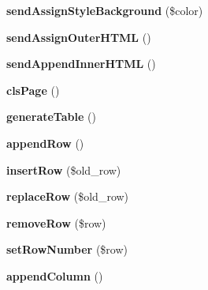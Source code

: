 \begin{DoxyCompactItemize}
\item 
\hypertarget{classclsPage_a0315870b55719467ad885007a5693394}{
{\bfseries sendAssignStyleBackground} (\$color)}
\label{classclsPage_a0315870b55719467ad885007a5693394}

\item 
\hypertarget{classclsPage_af2a2482d6a1a3b2f6627ff81d4dc2cd1}{
{\bfseries sendAssignOuterHTML} ()}
\label{classclsPage_af2a2482d6a1a3b2f6627ff81d4dc2cd1}

\item 
\hypertarget{classclsPage_af3d458057796887f6970506d45cd8187}{
{\bfseries sendAppendInnerHTML} ()}
\label{classclsPage_af3d458057796887f6970506d45cd8187}

\item 
\hypertarget{classclsPage_a7570ae140bcbd468397dce3f68a106dc}{
{\bfseries clsPage} ()}
\label{classclsPage_a7570ae140bcbd468397dce3f68a106dc}

\item 
\hypertarget{classclsPage_a54096a4d02a62858f8ce2bfa2a4675ea}{
{\bfseries generateTable} ()}
\label{classclsPage_a54096a4d02a62858f8ce2bfa2a4675ea}

\item 
\hypertarget{classclsPage_af3a720187e19f18cbd207744b8c93aba}{
{\bfseries appendRow} ()}
\label{classclsPage_af3a720187e19f18cbd207744b8c93aba}

\item 
\hypertarget{classclsPage_ab144c6bc84640a0774b23d00a1f52d8d}{
{\bfseries insertRow} (\$old\_\-row)}
\label{classclsPage_ab144c6bc84640a0774b23d00a1f52d8d}

\item 
\hypertarget{classclsPage_a6b19998af7a5d64d8a484887d10f2dfc}{
{\bfseries replaceRow} (\$old\_\-row)}
\label{classclsPage_a6b19998af7a5d64d8a484887d10f2dfc}

\item 
\hypertarget{classclsPage_af9b2bcdd6306aae7d9f1a1a25ca2e11a}{
{\bfseries removeRow} (\$row)}
\label{classclsPage_af9b2bcdd6306aae7d9f1a1a25ca2e11a}

\item 
\hypertarget{classclsPage_af55540504f72e16ad42f35cbefaa23c5}{
{\bfseries setRowNumber} (\$row)}
\label{classclsPage_af55540504f72e16ad42f35cbefaa23c5}

\item 
\hypertarget{classclsPage_a49a7ab88742daab057077648306ccc4f}{
{\bfseries appendColumn} ()}
\label{classclsPage_a49a7ab88742daab057077648306ccc4f}


\end{DoxyCompactItemize}

